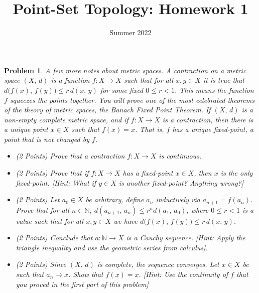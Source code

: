 \documentclass{article}
\title{Point-Set Topology: Homework 1}
\date{Summer 2022}
\theoremstyle{normal}
\newtheorem{problem}{Problem}
\begin{document}
    \maketitle
    \color{blue}
    \begin{problem}
        A few more notes about metric spaces. A \textit{contraction} on a
        metric space $(X,\,d)$ is a function $f:X\rightarrow{X}$ such that
        for all $x,y\in{X}$ it is true that
        $d\big(f(x),\,f(y)\big)\leq{r}\,d(x,\,y)$ for some fixed $0\leq{r}<1$.
        This means the function $f$ \textit{squeezes} the points together.
        You will prove one of the most celebrated theorems of the theory of
        metric spaces, the \textit{Banach Fixed Point Theorem}.
        If $(X,\,d)$ is a non-empty complete metric space, and if
        $f:X\rightarrow{X}$ is
        a contraction, then there is a unique point $x\in{X}$ such that
        $f(x)=x$. That is, $f$ has a unique \textit{fixed-point}, a point that
        is not changed by $f$.
        \begin{itemize}
            \item (2 Points) Prove that a contraction $f:X\rightarrow{X}$ is
                continuous.
            \item (2 Points) Prove that if $f:X\rightarrow{X}$ has a
                fixed-point $x\in{X}$, then $x$ is the only fixed-point.
                [Hint: What if $y\in{X}$ is another fixed-point?
                Anything wrong?]
            \item (2 Points) Let $a_{0}\in{X}$ be arbitrary, define $a_{n}$
                inductively via $a_{n+1}=f(a_{n})$. Prove that for all
                $n\in\mathbb{N}$,
                $d(a_{n+1},\,a_{n})\leq{r}^{n}d(a_{1},\,a_{0})$, where
                $0\leq{r}<1$ is a value such that for all
                $x,y\in{X}$ we have
                $d\big(f(x),\,f(y)\big)\leq{r}\,d(x,\,y)$.
            \item (2 Points) Conclude that $a:\mathbb{N}\rightarrow{X}$ is a
                Cauchy sequence. [Hint: Apply the triangle inequality and use
                the geometric series from calculus].
            \item (2 Points) Since $(X,\,d)$ is complete, the sequence
            converges. Let $x\in{X}$ be such that
            $a_{n}\rightarrow{x}$. Show that $f(x)=x$.
            [Hint: Use the continuity of $f$ that you proved in the first part
            of this problem]
        \end{itemize}
    \end{problem}
\end{document}
